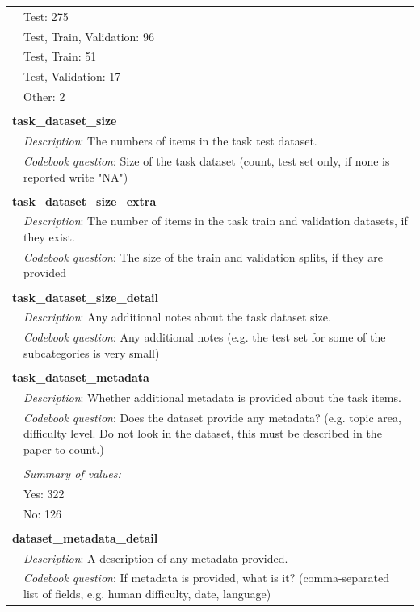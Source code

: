 {\begin{longtable}{p{}p{}}
& Test: 275 \\
& Test, Train, Validation: 96 \\
& Test, Train: 51 \\
& Test, Validation: 17 \\
& Other: 2 \\
\\
\multicolumn{2}{l}{\textbf{task\_dataset\_size}} \\
& \textit{Description}: The numbers of items in the task test dataset. \\
& \textit{Codebook question}: Size of the task dataset (count, test set only, if none is reported write "NA") \\
\\
\multicolumn{2}{l}{\textbf{task\_dataset\_size\_extra}} \\
& \textit{Description}: The number of items in the task train and validation datasets, if they exist. \\
& \textit{Codebook question}: The size of the train and validation splits, if they are provided \\
\\
\multicolumn{2}{l}{\textbf{task\_dataset\_size\_detail}} \\
& \textit{Description}: Any additional notes about the task dataset size. \\
& \textit{Codebook question}: Any additional notes (e.g. the test set for some of the subcategories is very small) \\
\\
\multicolumn{2}{l}{\textbf{task\_dataset\_metadata}} \\
& \textit{Description}: Whether additional metadata is provided about the task items. \\
& \textit{Codebook question}: Does the dataset provide any metadata? (e.g. topic area, difficulty level. Do not look in the dataset, this must be described in the paper to count.) \\
\\
& \textit{Summary of values:} \\
& Yes: 322 \\
& No: 126 \\
\\
\multicolumn{2}{l}{\textbf{dataset\_metadata\_detail}} \\
& \textit{Description}: A description of any metadata provided. \\
& \textit{Codebook question}: If metadata is provided, what is it? (comma-separated list of fields, e.g. human difficulty, date, language) \\

\end{longtable}}
